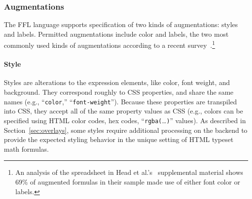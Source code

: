 \subsubsection{Augmentations}

The FFL language supports specification of two kinds of augmentations: styles and labels. Permitted augmentations include color and labels, the two most commonly used kinds of augmentations according to a recent survey~\cite{ref:head2022math}.\footnote{An analysis of the spreadsheet in Head et al.'s~\cite{ref:head2022math} supplemental material shows 69\% of augmented formulas in their sample made use of either font color or labels.}

\paragraph{Style}
Styles are alterations to the expression elements, like color, font weight, and background. They correspond roughly to CSS properties, and share the same names (e.g., ``\texttt{color},'' ``\texttt{font-weight}''). Because these properties are transpiled into CSS, they accept all of the same property values as CSS (e.g., colors can be specified using HTML color codes, hex codes, ``\texttt{rgba(}\dots\texttt{)}'' values). As described in Section~\ref{sec:overlays}, some styles require additional processing on the backend to provide the expected styling behavior in the unique setting of HTML typeset math formulas.


